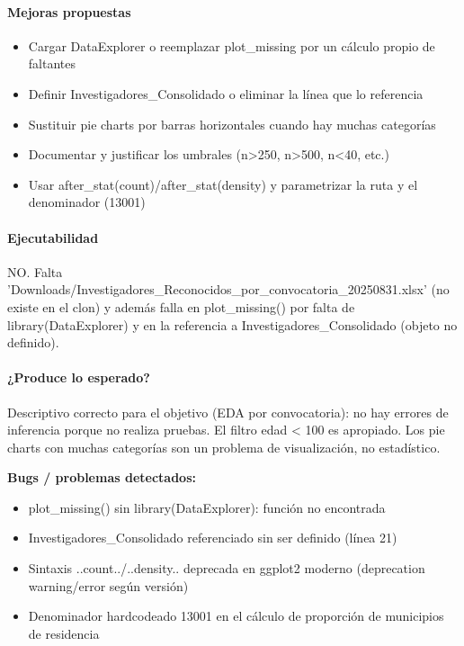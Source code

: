 \paragraph{Mejoras propuestas}
\begin{itemize}
  \item Cargar DataExplorer o reemplazar plot\_missing por un cálculo propio de faltantes
  \item Definir Investigadores\_Consolidado o eliminar la línea que lo referencia
  \item Sustituir pie charts por barras horizontales cuando hay muchas categorías
  \item Documentar y justificar los umbrales (n>250, n>500, n<40, etc.)
  \item Usar after\_stat(count)/after\_stat(density) y parametrizar la ruta y el denominador (13001)
\end{itemize}

\paragraph{Ejecutabilidad}
NO. Falta 'Downloads/Investigadores\_Reconocidos\_por\_convocatoria\_20250831.xlsx' (no existe en el clon) y además falla en plot\_missing() por falta de library(DataExplorer) y en la referencia a Investigadores\_Consolidado (objeto no definido).

\paragraph{¿Produce lo esperado?}
Descriptivo correcto para el objetivo (EDA por convocatoria): no hay errores de inferencia porque no realiza pruebas. El filtro edad < 100 es apropiado. Los pie charts con muchas categorías son un problema de visualización, no estadístico.

\begin{tcolorbox}[riesgo]
\textbf{Bugs / problemas detectados:}
\begin{itemize}
  \item plot\_missing() sin library(DataExplorer): función no encontrada
  \item Investigadores\_Consolidado referenciado sin ser definido (línea 21)
  \item Sintaxis ..count../..density.. deprecada en ggplot2 moderno (deprecation warning/error según versión)
  \item Denominador hardcodeado 13001 en el cálculo de proporción de municipios de residencia
\end{itemize}
\end{tcolorbox}

